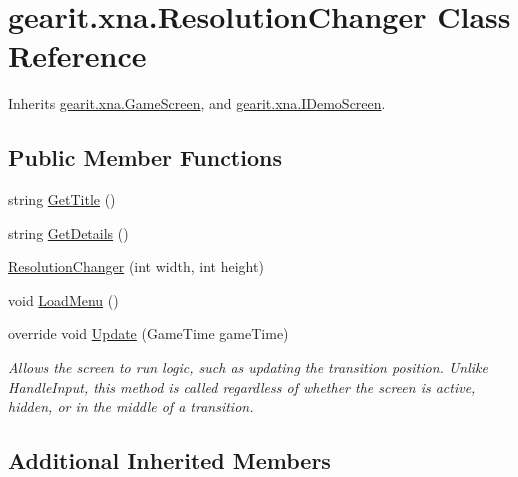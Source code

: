 \hypertarget{classgearit_1_1xna_1_1_resolution_changer}{\section{gearit.\+xna.\+Resolution\+Changer Class Reference}
\label{classgearit_1_1xna_1_1_resolution_changer}
}


Inherits \hyperlink{classgearit_1_1xna_1_1_game_screen}{gearit.\+xna.\+Game\+Screen}, and \hyperlink{interfacegearit_1_1xna_1_1_i_demo_screen}{gearit.\+xna.\+I\+Demo\+Screen}.

\subsection*{Public Member Functions}
\begin{DoxyCompactItemize}
\item 
string \hyperlink{classgearit_1_1xna_1_1_resolution_changer_ae7af9ae9638b39a87cba0acc9b1a5bdb}{Get\+Title} ()
\item 
string \hyperlink{classgearit_1_1xna_1_1_resolution_changer_af15af978b00492e8aecccbf050649049}{Get\+Details} ()
\item 
\hyperlink{classgearit_1_1xna_1_1_resolution_changer_aeeabc90b1eb2bb6c10ffe1717294e975}{Resolution\+Changer} (int width, int height)
\item 
void \hyperlink{classgearit_1_1xna_1_1_resolution_changer_ae919b93cfeddf98415d55b2402b566d4}{Load\+Menu} ()
\item 
override void \hyperlink{classgearit_1_1xna_1_1_resolution_changer_af7c95fad5897414551ed2c70b566765f}{Update} (Game\+Time game\+Time)
\begin{DoxyCompactList}\small\item\em Allows the screen to run logic, such as updating the transition position. Unlike Handle\+Input, this method is called regardless of whether the screen is active, hidden, or in the middle of a transition. \end{DoxyCompactList}\end{DoxyCompactItemize}
\subsection*{Additional Inherited Members}


